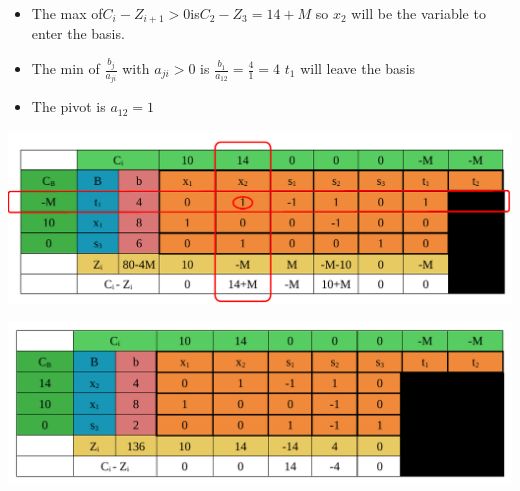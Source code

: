 \vspace{0.25cm}
\begin{itemize}   
\item The max of\hspace{0.2cm}\(C_i - Z_{i+1} > 0\)\hspace{0.2cm}is\hspace{0.2cm}\(C_2 - Z_3 = 14+M\)\hspace{0.1cm} so \(x_2\) 
will be the variable to enter the basis.
\item The min of \hspace{0.1cm}\(\frac{b_j}{a_{ji}}\)\hspace{0.1cm} with \(a_{ji} > 0\)\hspace{0.1cm} is \hspace{0.1cm} \(\frac{b_1}{a_{12}} = \frac{4}{1} = 4\)\hspace{0.35cm} \(t_1\)
will leave the basis
\item The pivot is \(a_{12} = 1\)
 
\end{itemize}


\vspace{0.25cm}




\begin{center}
    \includegraphics{Chapters/Simplexe/EX/EX6/ex6.4.pdf}
\end{center}

\newpage

\begin{center}
    \includegraphics{Chapters/Simplexe/EX/EX6/ex6.5.pdf}
\end{center}


